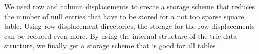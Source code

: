 We used row and column displacements to create a storage scheme that reduces the number of null entries that have to be stored for a not too sparse square table.
Using row displacement directories, the storage for the row displacements can be reduced even more.
By using the internal structure of the trie data structure, we finally get a storage scheme that is good for all tables.